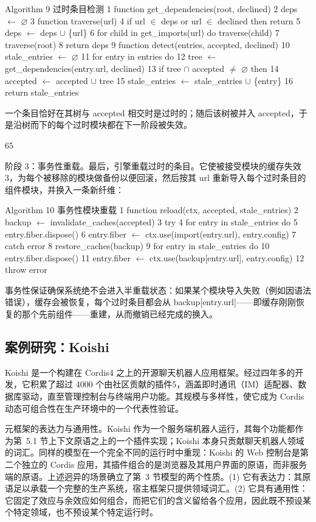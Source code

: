 \documentclass[
  10
]{article}
\begin{document}
Algorithm 9 过时条目检测 1 function get\_dependencies(root,
declined) 2 deps $\leftarrow$ $\varnothing$ 3 function traverse(url) 4 if url $\in$ deps or url $\in$
declined then return 5 deps $\leftarrow$ deps $\cup$ \{url\} 6 for child in
get\_imports(url) do traverse(child) 7 traverse(root) 8 return deps 9
function detect(entries, accepted, declined) 10 stale\_entries $\leftarrow$ $\varnothing$ 11
for entry in entries do 12 tree $\leftarrow$ get\_dependencies(entry.url, declined)
13 if tree $\cap$ accepted $\neq$ $\varnothing$ then 14 accepted $\leftarrow$ accepted $\cup$ tree 15
stale\_entries $\leftarrow$ stale\_entries $\cup$ \{entry\} 16 return stale\_entries

一个条目恰好在其树与 accepted 相交时是过时的；随后该树被并入 accepted，于是沿树而下的每个过时模块都在下一阶段被失效。

65

阶段 3：事务性重载。最后，引擎重载过时的条目。它使被接受模块的缓存失效3，为每个被移除的模块做备份以便回滚，然后按其 url 重新导入每个过时条目的组件模块，并换入一条新纤维：

Algorithm 10 事务性模块重载 1 function reload(ctx,
accepted, stale\_entries) 2 backup $\leftarrow$ invalidate\_caches(accepted) 3 try
4 for entry in stale\_entries do 5 entry.fiber.dispose() 6 entry.fiber $\leftarrow$
ctx.use(import(entry.url), entry.config) 7 catch error 8
restore\_caches(backup) 9 for entry in stale\_entries do 10
entry.fiber.dispose() 11 entry.fiber $\leftarrow$ ctx.use(backup{[}entry.url{]},
entry.config) 12 throw error

事务性保证确保系统绝不会进入半重载状态：如果某个模块导入失败（例如因语法错误），缓存会被恢复，每个过时条目都会从 backup{[}entry.url{]}——即缓存刚刚恢复的那个先前组件——重建，从而撤销已经完成的换入。

\subsection{案例研究：Koishi} \label{case-study-koishi}

Koishi 是一个构建在 Cordis4 之上的开源聊天机器人应用框架。经过四年多的开发，它积累了超过 4000 个由社区贡献的插件5，涵盖即时通讯（IM）适配器、数据库驱动，直至管理控制台与终端用户功能。其规模与多样性，使它成为 Cordis 动态可组合性在生产环境中的一个代表性验证。

元框架的表达力与通用性。Koishi 作为一个服务端机器人运行，其每个功能都作为第~5.1 节上下文原语之上的一个插件实现；Koishi 本身只贡献聊天机器人领域的词汇。同样的模型在一个完全不同的运行时中重现：Koishi 的 Web 控制台是第二个独立的 Cordis 应用，其插件组合的是浏览器及其用户界面的原语，而非服务端的原语。上述迥异的场景确立了第~3 节模型的两个性质。(1) 它有表达力：其原语足以承载一个完整的生产系统，宿主框架只提供领域词汇。(2) 它具有通用性：它固定了效应与余效应如何组合，而把它们的含义留给各个应用，因此既不预设某个特定领域，也不预设某个特定运行时。
\end{document}
